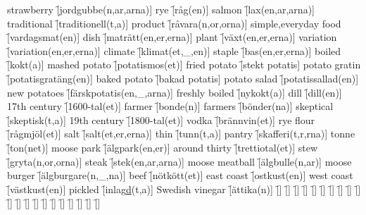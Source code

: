 \begin{questions}
    \begin{multicols}{2}
        \raggedcolumns
        \question strawberry \f[jordgubbe(n,ar,arna)]
        \question rye \f[råg(en)]
        \question salmon \f[lax(en,ar,arna)]
        \question traditional \f[traditionell(t,a)]
        \question product \f[råvara(n,or,orna)]
        \question simple,everyday food \f[vardagsmat(en)]
        \question dish \f[maträtt(en,er,erna)]
        \question plant \f[växt(en,er,erna)]
        \question variation \f[variation(en,er,erna)]
        \question climate \f[klimat(et,\_,en)]
        \question staple \f[bas(en,er,erna)]
        \question boiled \f[kokt(a)]
        \question mashed potato \f[potatismos(et)]
        \question fried potato \f[stekt potatis]
        \question potato gratin \f[potatisgratäng(en)]
        \question baked potato \f[bakad potatis]
        \question potato salad \f[potatissallad(en)]
        \question new potatoes \f[färskpotatis(en,\_,arna)]
        \question freshly boiled \f[nykokt(a)]
        \question dill \f[dill(en)]
        \question 17th century \f[1600-tal(et)]
        \question farmer \f[bonde(n)]
        \question farmers \f[bönder(na)]
        \question skeptical \f[skeptisk(t,a)]
        \question 19th century \f[1800-tal(et)]
        \question vodka \f[brännvin(et)]
        \question rye flour \f[rågmjöl(et)]
        \question salt \f[salt(et,er,erna)]
        \question thin \f[tunn(t,a)]
        \question pantry \f[skafferi(t,r,rna)]
        \question tonne \f[ton(net)]
        \question moose park \f[älgpark(en,er)]
        \question around thirty \f[trettiotal(et)]
        \question stew \f[gryta(n,or,orna)]
        \question steak \f[stek(en,ar,arna)]
        \question moose meatball \f[älgbulle(n,ar)]
        \question moose burger \f[älgburgare(n,\_,na)]
        \question beef \f[nötkött(et)]
        \question east coast \f[ostkust(en)]
        \question west coast \f[västkust(en)]
        \question pickled \f[inlag\underline{d}(t,a)]
        \question Swedish vinegar \f[ättika(n)]
        \question  \f[]
        \question  \f[]
        \question  \f[]
        \question  \f[]
        \question  \f[]
        \question  \f[]
        \question  \f[]
        \question  \f[]
        \question  \f[]
        \question  \f[]
        \question  \f[]
        \question  \f[]
        \question  \f[]
        \question  \f[]
        \question  \f[]
        \question  \f[]
        \question  \f[]
        \question  \f[]
        \question  \f[]
        \question  \f[]
        \question  \f[]

\end{multicols}
\end{questions}
